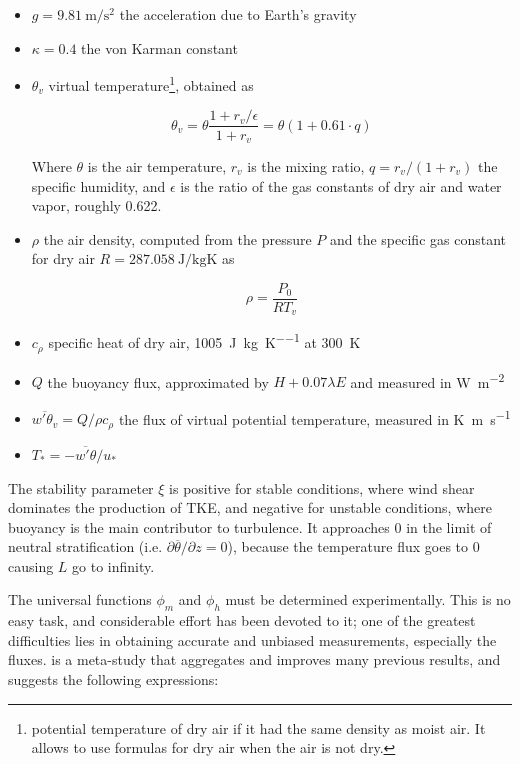 \documentclass[12pt]{book}
\begin{document}
\begin{itemize}
\item $g=\SI{9.81}{\meter\per\square\second}$ the acceleration due to Earth's gravity
\item $\kappa=0.4$ the von Karman constant

\item $\theta_v$ virtual temperature\footnote{potential temperature of dry air if it had the same density as moist air. It allows to use formulas for dry air when the air is not dry.}, obtained as

\begin{equation}
\label{eq:vtemp}
\theta_v=\theta\frac{1+r_v/\epsilon}{1+r_v}=\theta(1+0.61\cdot q)
\end{equation}

Where $\theta$ is the air temperature, $r_v$ is the mixing ratio, $q=r_v/(1+r_v)$ the specific humidity, and $\epsilon$ is the ratio of the gas constants of dry air and water vapor, roughly 0.622.

\item $\rho$ the air density, computed from the pressure $P$ and the specific gas constant for dry air $R=\SI{287.058}{\joule\per\kilo\gram\kelvin}$ as

$$
\rho=\frac{P_0}{RT_v}
$$


\item $c_\rho$ specific heat of dry air, \SI{1005}{\joule\per\kilo\gram\per\kelvin} at \SI{300}{\kelvin}
\item $Q$ the buoyancy flux, approximated by $H+0.07\lambda E$ and measured in \si{\watt\per\square\meter}
\item $\overline{w'\theta_v}=Q/\rho c_\rho$ the flux of virtual potential temperature, measured in \si{\kelvin\meter\per\second}
\item $T_*=-\overline{w'\theta}/u_*$
\end{itemize}

The stability parameter $\xi$ is positive for stable conditions, where wind shear dominates the production of TKE, and negative for unstable conditions, where buoyancy is the main contributor to turbulence. It approaches 0 in the limit of neutral stratification (i.e. $\partial\overline{\theta}/\partial z=0$), because the temperature flux goes to 0 causing $L$ go to infinity.

The universal functions $\phi_m$ and $\phi_h$ must be determined experimentally. This is no easy task, and considerable effort has been devoted to it; one of the greatest difficulties lies in obtaining accurate and unbiased measurements, especially the fluxes. \cite{hogstrom88} is a meta-study that aggregates and improves many previous results, and suggests the following expressions:
\end{document}
